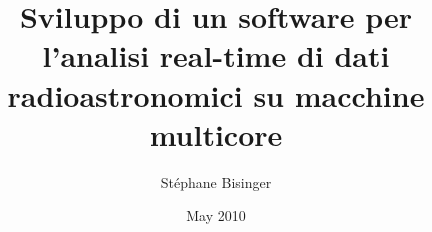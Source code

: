 \documentclass[a4paper,11pt,twoside,openright]{unibo}
\begin{document}
\title{Sviluppo di un software per l'analisi real-time di dati
radioastronomici su macchine multicore}
\author{St\'ephane Bisinger}
\date{May 2010}

\maketitle
%

\tableofcontents
\listoffigures
\lstlistoflistings











\end{document}
